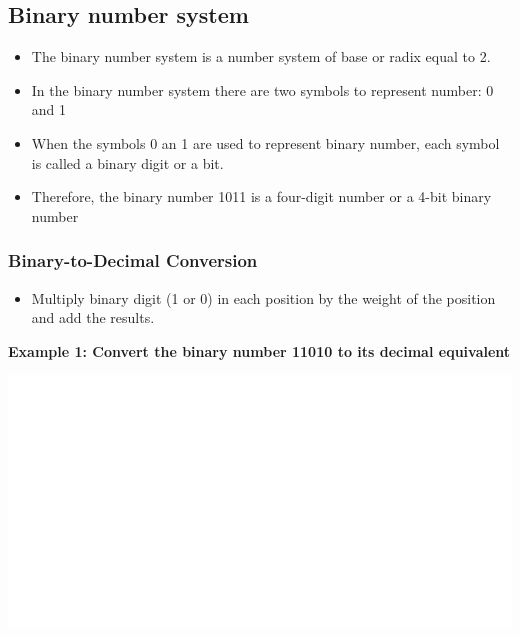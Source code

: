 \documentclass[]{book}
\providecommand{\tightlist}{%
  \setlength{\itemsep}{0pt}\setlength{\parskip}{0pt}}
\begin{document}
\hypertarget{binary-number-system}{%
\subsection{Binary number system}\label{binary-number-system}}

\begin{itemize}
\tightlist
\item
  The binary number system is a number system of base or radix equal to 2.
\item
  In the binary number system there are two symbols to represent number: 0 and 1
\item
  When the symbols 0 an 1 are used to represent binary number, each symbol is called a binary digit or a bit.
\item
  Therefore, the binary number 1011 is a four-digit number or a 4-bit binary number
\end{itemize}

\hypertarget{binary-to-decimal-conversion}{%
\subsubsection{Binary-to-Decimal Conversion}\label{binary-to-decimal-conversion}}

\begin{itemize}
\tightlist
\item
  Multiply binary digit (1 or 0) in each position by the weight of the position and add the results.
\end{itemize}

\textbf{Example 1: Convert the binary number 11010 to its decimal equivalent}

\begin{center}\includegraphics[width=1\linewidth]{figure/NSbox2-1} \end{center}
\end{document}
